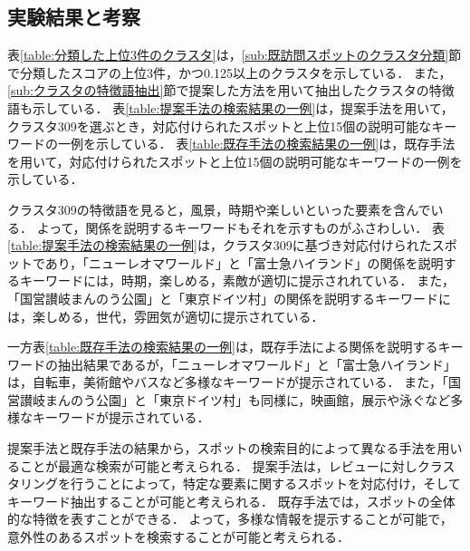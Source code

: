 \documentclass{deimj}
\begin{document}
\subsection{実験結果と考察}

表\ref{table:分類した上位3件のクラスタ}は，\ref{sub:既訪問スポットのクラスタ分類}節で分類したスコアの上位3件，かつ0.125以上のクラスタを示している．
また，\ref{sub:クラスタの特徴語抽出}節で提案した方法を用いて抽出したクラスタの特徴語も示している．
表\ref{table:提案手法の検索結果の一例}は，提案手法を用いて，クラスタ309を選ぶとき，対応付けられたスポットと上位15個の説明可能なキーワードの一例を示している．
表\ref{table:既存手法の検索結果の一例}は，既存手法を用いて，対応付けられたスポットと上位15個の説明可能なキーワードの一例を示している．

クラスタ309の特徴語を見ると，風景，時期や楽しいといった要素を含んでいる．
よって，関係を説明するキーワードもそれを示すものがふさわしい．
表\ref{table:提案手法の検索結果の一例}は，クラスタ309に基づき対応付けられたスポットであり，「ニューレオマワールド」と「富士急ハイランド」の関係を説明するキーワードには，時期，楽しめる，素敵が適切に提示されれている．
また，「国営讃岐まんのう公園」と「東京ドイツ村」の関係を説明するキーワードには，楽しめる，世代，雰囲気が適切に提示されている．

一方表\ref{table:既存手法の検索結果の一例}は，既存手法による関係を説明するキーワードの抽出結果であるが，「ニューレオマワールド」と「富士急ハイランド」は，自転車，美術館やバスなど多様なキーワードが提示されている．
また，「国営讃岐まんのう公園」と「東京ドイツ村」も同様に，映画館，展示や泳ぐなど多様なキーワードが提示されている．

提案手法と既存手法の結果から，スポットの検索目的によって異なる手法を用いることが最適な検索が可能と考えられる．
提案手法は，レビューに対しクラスタリングを行うことによって，特定な要素に関するスポットを対応付け，そしてキーワード抽出することが可能と考えられる．
既存手法では，スポットの全体的な特徴を表すことができる．
よって，多様な情報を提示することが可能で，意外性のあるスポットを検索することが可能と考えられる．


\end{document}
